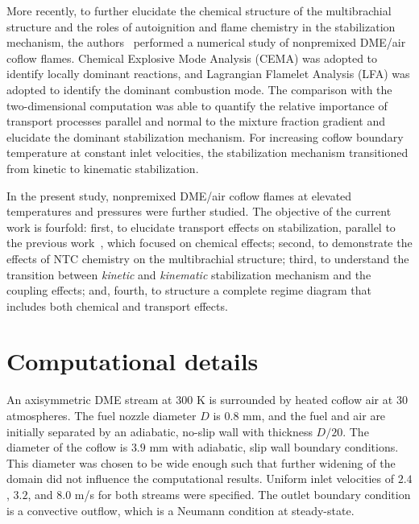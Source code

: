 \documentclass[review,3p,times]{elsarticle}
\begin{document}
More recently, to further elucidate the chemical structure of the multibrachial structure and the roles of autoignition and flame chemistry in the stabilization mechanism, the authors~\cite{deng15} performed a numerical study of nonpremixed DME/air coflow flames.  Chemical Explosive Mode Analysis (CEMA) was adopted to identify locally dominant reactions, and Lagrangian Flamelet Analysis (LFA) was adopted to identify the dominant combustion mode.  The comparison with the two-dimensional computation was able to quantify the relative importance of transport processes parallel and normal to the mixture fraction gradient and elucidate the dominant stabilization mechanism.  For increasing coflow boundary temperature at constant inlet velocities, the stabilization mechanism transitioned from kinetic to kinematic stabilization.


\textcolor{Rv1}{In the present study, nonpremixed DME/air coflow flames at elevated temperatures and pressures were further studied.  The objective of the current work is fourfold: first, to elucidate transport effects on stabilization, parallel to the previous work~\cite{deng15}, which focused on chemical effects; second, to demonstrate the effects of NTC chemistry on the multibrachial structure; third, to understand the transition between \emph{kinetic} and \emph{kinematic} stabilization mechanism and the coupling effects; and, fourth, to structure a complete regime diagram that includes both chemical and transport effects.}

 

\section{Computational details} \label{sec:computation}

An axisymmetric DME stream at $300$ K is surrounded by heated coflow air at $30$ atmospheres.  The fuel nozzle diameter $D$ is $0.8$ mm, and the fuel and air are initially separated by an adiabatic, no-slip wall with thickness $D/20$.  The diameter of the coflow is $3.9$ mm with adiabatic, slip wall boundary conditions.  This diameter was chosen to be wide enough such that further widening of the domain did not influence the computational results.  Uniform inlet velocities of $2.4$, $3.2$, and $8.0$ m/s for both streams were specified.  The outlet boundary condition is a convective outflow, which is a Neumann condition at steady-state.
\end{document}
